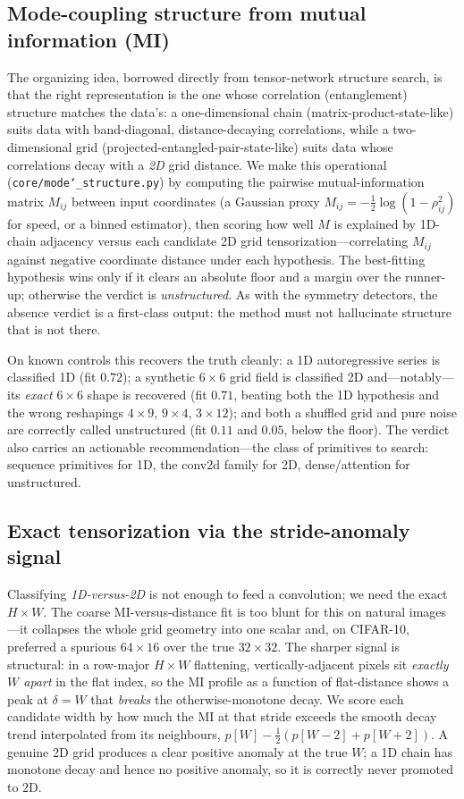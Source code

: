 \documentclass[11pt]{article}
\newcommand{\allowbreakhere}{\discretionary{}{}{}}
\newcommand{\code}[1]{\texttt{\def\_{\char`_\allowbreakhere}#1}}
\begin{document}
\subsection{Mode-coupling structure from mutual information (MI)}
\label{sec:modecoupling}

The organizing idea, borrowed directly from tensor-network structure search, is that the right
representation is the one whose correlation (entanglement) structure matches the data's: a
one-dimensional chain (matrix-product-state-like) suits data with band-diagonal, distance-decaying
correlations, while a two-dimensional grid (projected-entangled-pair-state-like) suits data whose
correlations decay with a \emph{2D} grid distance. We make this operational
(\code{core/mode\_structure.py}) by computing the pairwise mutual-information matrix $M_{ij}$ between
input coordinates (a Gaussian proxy $M_{ij}=-\tfrac12\log(1-\rho_{ij}^2)$ for speed, or a binned
estimator), then scoring how well $M$ is explained by 1D-chain adjacency versus each candidate 2D
grid tensorization---correlating $M_{ij}$ against negative coordinate distance under each hypothesis.
The best-fitting hypothesis wins only if it clears an absolute floor and a margin over the
runner-up; otherwise the verdict is \emph{unstructured}. As with the symmetry detectors, the absence
verdict is a first-class output: the method must not hallucinate structure that is not there.

On known controls this recovers the truth cleanly: a 1D autoregressive series is classified 1D (fit
$0.72$); a synthetic $6\times6$ grid field is classified 2D and---notably---its \emph{exact} $6\times6$
shape is recovered (fit $0.71$, beating both the 1D hypothesis and the wrong reshapings $4\times9$,
$9\times4$, $3\times12$); and both a shuffled grid and pure noise are correctly called unstructured
(fit $0.11$ and $0.05$, below the floor). The verdict also carries an actionable recommendation---the
class of primitives to search: sequence primitives for 1D, the conv2d family for 2D, dense/attention
for unstructured.

\subsection{Exact tensorization via the stride-anomaly signal}
\label{sec:stride}

Classifying \emph{1D-versus-2D} is not enough to feed a convolution; we need the exact $H\times W$.
The coarse MI-versus-distance fit is too blunt for this on natural images---it collapses the whole
grid geometry into one scalar and, on CIFAR-10, preferred a spurious $64\times16$ over the true
$32\times32$. The sharper signal is structural: in a row-major $H\times W$ flattening,
vertically-adjacent pixels sit \emph{exactly $W$ apart} in the flat index, so the MI profile as a
function of flat-distance shows a peak at $\delta=W$ that \emph{breaks} the otherwise-monotone decay.
We score each candidate width by how much the MI at that stride exceeds the smooth decay trend
interpolated from its neighbours, $p[W]-\tfrac12(p[W-2]+p[W+2])$. A genuine 2D grid produces a clear
positive anomaly at the true $W$; a 1D chain has monotone decay and hence no positive anomaly, so it
is correctly never promoted to 2D.
\end{document}
